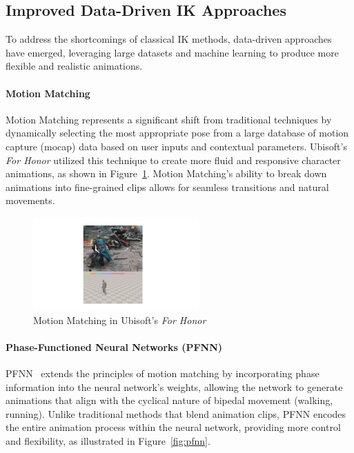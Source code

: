 \documentclass[../../main.tex]{subfiles}
\begin{document}
\subsection{Improved Data-Driven IK Approaches}
\label{ch:pose_correction:related_work:data_driven_ik}
To address the shortcomings of classical IK methods, data-driven approaches have emerged, leveraging large datasets and machine learning to produce more flexible and realistic animations.

\paragraph{Motion Matching} Motion Matching represents a significant shift from traditional techniques by dynamically selecting the most appropriate pose from a large database of motion capture (mocap) data based on user inputs and contextual parameters. Ubisoft's \emph{For Honor} utilized this technique to create more fluid and responsive character animations, as shown in Figure~\ref{fig:for_honor}. Motion Matching's ability to break down animations into fine-grained clips allows for seamless transitions and natural movements.

\begin{figure}
  \centering \includegraphics[width = 2.5in]{chapters/pose_correction/images/for_honor.png}
  \caption{Motion Matching in Ubisoft’s \emph{For Honor}}
  \label{fig:for_honor}
\end{figure}

\paragraph{Phase-Functioned Neural Networks (PFNN)} PFNN~\cite{10.1145/3072959.3073663} extends the principles of motion matching by incorporating phase information into the neural network’s weights, allowing the network to generate animations that align with the cyclical nature of bipedal movement (walking, running). Unlike traditional methods that blend animation clips, PFNN encodes the entire animation process within the neural network, providing more control and flexibility, as illustrated in Figure~\ref{fig:pfnn}.
\end{document}
